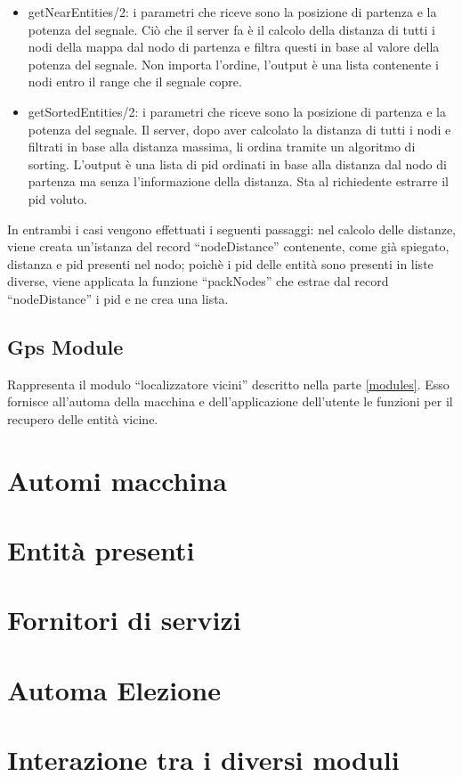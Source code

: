 \begin{itemize}
	\item getNearEntities/2: i parametri che riceve sono la posizione di partenza e la potenza del segnale. Ciò che il server fa è il calcolo della distanza di tutti i nodi della mappa dal nodo di partenza e filtra questi in base al valore della potenza del segnale. Non importa l'ordine, l'output è una lista contenente i nodi entro il range che il segnale copre.
	\item getSortedEntities/2: i parametri che riceve sono la posizione di partenza e la potenza del segnale. Il server, dopo aver calcolato la distanza di tutti i nodi e filtrati in base alla distanza massima, li ordina tramite un algoritmo di sorting. L'output è una lista di pid ordinati in base alla distanza dal nodo di partenza ma senza l'informazione della distanza. Sta al richiedente estrarre il pid voluto.
\end{itemize}

In entrambi i casi vengono effettuati i seguenti passaggi: nel calcolo delle distanze, viene creata un'istanza del record ``nodeDistance'' contenente, come già spiegato, distanza e pid presenti nel nodo; poichè i pid delle entità sono presenti in liste diverse, viene applicata la funzione ``packNodes'' che estrae dal record ``nodeDistance'' i pid e ne crea una lista.

\subsection{Gps Module}\label{gps_module}
Rappresenta il modulo ``localizzatore vicini'' descritto nella parte \ref{modules}. Esso fornisce all'automa della macchina e dell'applicazione dell'utente le funzioni per il recupero delle entità vicine.



\section{Automi macchina}

\section{Entità presenti}

\section{Fornitori di servizi}

\section{Automa Elezione}

\section{Interazione tra i diversi moduli}

